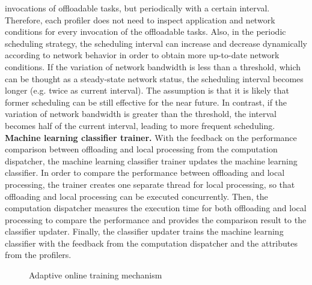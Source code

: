 \documentclass[10pt, conference, compsocconf]{IEEEtran}
\begin{document}
{{invocations of offloadable tasks, but periodically with a certain
interval.
%
Therefore, each profiler does not need to inspect application
and network conditions for every invocation of the offloadable tasks.
%
Also, in the periodic scheduling strategy, the scheduling interval
can increase and decrease dynamically according to network behavior
in order to obtain more up-to-date network conditions.
%
If the variation of network bandwidth is less than a threshold, which
can be thought as a steady-state network status, the scheduling interval 
becomes longer (e.g. twice as current interval).
%
The assumption is that it is likely that former scheduling can be 
still effective for the near future.
%
In contrast, if the variation of network bandwidth is greater than the
threshold, the interval becomes half of the current interval, leading to
more frequent scheduling.\\
%
%
%
%
%
\indent \textbf{Machine learning classifier trainer.} With the feedback on the
performance comparison between offloading and local processing from the
computation dispatcher, the machine learning classifier trainer updates
the machine learning classifier.
%
In order to compare the performance between offloading and local
processing, the trainer creates one separate thread for local
processing, so that offloading and local processing can be executed
concurrently.
%
Then, the computation dispatcher measures the execution time for both
offloading and local processing to compare the performance and provides
the comparison result to the classifier updater. 
%
Finally, the classifier updater trains the machine learning classifier 
with the feedback from the computation dispatcher and the attributes
from the profilers.
%
\begin{figure}
\begin{algorithmic}[1]
	\ELSE
		\ELSE
		\ENDIF
	\ENDIF
\ENDWHILE
\STATE
{}
\ELSE
\ENDIF
\end{algorithmic}
\caption{Adaptive online training mechanism}
\end{figure}
%
}}
\end{document}
